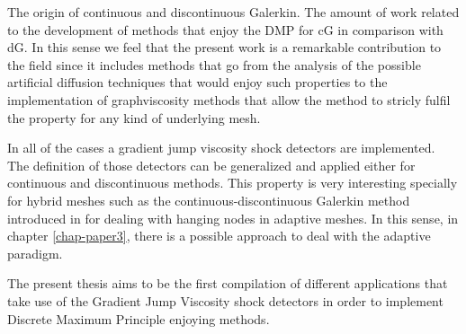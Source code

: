 The origin of continuous and discontinuous Galerkin. The amount of work related to the development of methods that enjoy the DMP for cG in comparison with dG. In this sense we feel that the present work is a remarkable contribution to the field since it includes methods that go from the analysis of the possible artificial diffusion techniques that would enjoy such properties to the implementation of graphviscosity methods that allow the method to stricly fulfil the property for any kind of underlying mesh.

In all of the cases a gradient jump viscosity shock detectors are implemented. The definition of those detectors can be generalized and applied either for continuous and discontinuous methods. This property is very interesting specially for hybrid meshes such as the continuous-discontinuous Galerkin method introduced in \cite{badia_adaptive_2013} for dealing with hanging nodes in adaptive meshes. In this sense, in chapter \ref{chap-paper3}, there is a possible approach to deal with the adaptive paradigm.

The present thesis aims to be the first compilation of different applications that take use of the Gradient Jump Viscosity shock detectors in order to implement Discrete Maximum Principle enjoying methods.